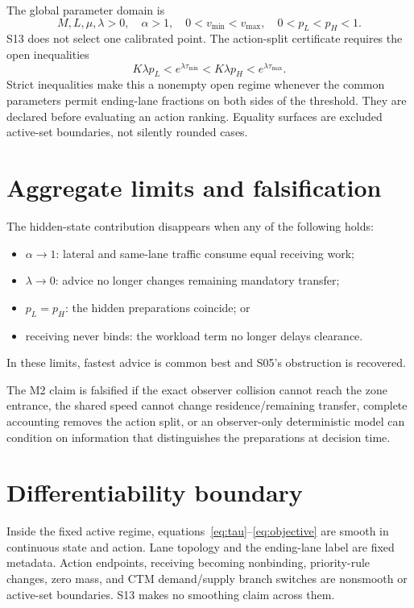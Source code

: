 \documentclass[11pt]{article}
\begin{document}
The global parameter domain is
\begin{equation}
 M,L,\mu,\lambda>0,\quad \alpha>1,\quad
 0<v_{\min}<v_{\max},\quad 0<p_L<p_H<1.
 \label{eq:domain}
\end{equation}
S13 does not select one calibrated point. The action-split certificate requires
the open inequalities
\begin{equation}
 K\lambda p_L<e^{\lambda\tau_{\min}}
 <K\lambda p_H<e^{\lambda\tau_{\max}}.
 \label{eq:open}
\end{equation}
Strict inequalities make this a nonempty open regime whenever the common
parameters permit ending-lane fractions on both sides of the threshold. They
are declared before evaluating an action ranking. Equality surfaces are excluded
active-set boundaries, not silently rounded cases.

\section{Aggregate limits and falsification}

The hidden-state contribution disappears when any of the following holds:
\begin{itemize}
\item \(\alpha\to1\): lateral and same-lane traffic consume equal receiving work;
\item \(\lambda\to0\): advice no longer changes remaining mandatory transfer;
\item \(p_L=p_H\): the hidden preparations coincide; or
\item receiving never binds: the workload term no longer delays clearance.
\end{itemize}
In these limits, fastest advice is common best and S05's obstruction is recovered.

The M2 claim is falsified if the exact observer collision cannot reach the zone
entrance, the shared speed cannot change residence/remaining transfer, complete
accounting removes the action split, or an observer-only deterministic model can
condition on information that distinguishes the preparations at decision time.

\section{Differentiability boundary}

Inside the fixed active regime, equations~\eqref{eq:tau}--\eqref{eq:objective}
are smooth in continuous state and action. Lane topology and the ending-lane
label are fixed metadata. Action endpoints, receiving becoming nonbinding,
priority-rule changes, zero mass, and CTM demand/supply branch switches are
nonsmooth or active-set boundaries. S13 makes no smoothing claim across them.
\end{document}
